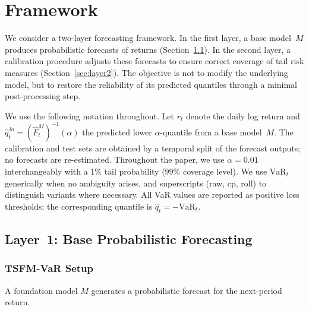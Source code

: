 \documentclass[preprint,11pt,authoryear]{elsarticle}
\newcommand{\VaR}{\mathrm{VaR}}
\newcommand{\1}{\boldsymbol{1}}
\begin{document}
	
	
	\section{Framework}
	\label{sec:framework}
	
	We consider a two-layer forecasting framework.
	In the first layer, a base model~$M$ produces
	probabilistic forecasts of returns
	(Section~\ref{sec:layer1}).
	In the second layer, a calibration procedure adjusts
	these forecasts to ensure correct coverage of tail
	risk measures (Section~\ref{sec:layer2}).
	The objective is not to modify the
	underlying model, but to restore the reliability of
	its predicted quantiles through a minimal
	post-processing step.
	
	We use the following notation throughout. Let $r_t$
	denote the daily log return and
	$\hat{q}_t^{\,lo} = (\hat{F}_t^M)^{-1}(\alpha)$ the
	predicted lower $\alpha$-quantile from a base model~$M$.
	The calibration and test sets are obtained by a temporal
	split of the forecast outputs; no forecasts are
	re-estimated.
	Throughout the paper, we use $\alpha = 0.01$ interchangeably with a 1\% tail probability (99\% coverage level).
	We use $\VaR_t$ generically when no ambiguity arises, and superscripts (raw, cp, roll) to distinguish variants where necessary. All VaR values are reported as positive loss thresholds; the corresponding quantile is $\hat{q}_t = -\VaR_t$.

	\subsection{Layer~1: Base Probabilistic Forecasting}
	\label{sec:layer1}
	
	\subsubsection{TSFM-VaR Setup}
	\label{sec:setup}
	
	A foundation model $M$ generates a probabilistic forecast for
	the next-period return.
	
\end{document}
